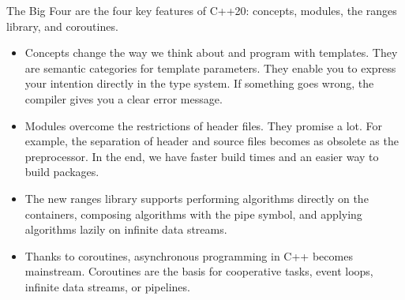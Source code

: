The Big Four are the four key features of C++20: concepts, modules, the ranges library, and coroutines.

\begin{itemize}
\item 
Concepts change the way we think about and program with templates. They are semantic categories for template parameters. They enable you to express your intention directly in the type system. If something goes wrong, the compiler gives you a clear error message.

\item 
Modules overcome the restrictions of header files. They promise a lot. For example, the separation of header and source files becomes as obsolete as the preprocessor. In the end, we have faster build times and an easier way to build packages.

\item 
The new ranges library supports performing algorithms directly on the containers, composing algorithms with the pipe symbol, and applying algorithms lazily on infinite data streams.

\item 
Thanks to coroutines, asynchronous programming in C++ becomes mainstream. Coroutines are the basis for cooperative tasks, event loops, infinite data streams, or pipelines.
\end{itemize}